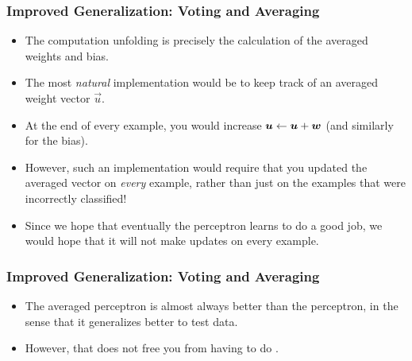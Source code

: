 \documentclass[trans]{beamer}
\begin{document}
\begin{frame}
  \frametitle{Improved Generalization: Voting and Averaging}
\begin{itemize}
\item 
The computation unfolding is
precisely the calculation of the averaged weights and bias.  
\item The most
\emph{natural} implementation would be to keep track of an averaged
weight vector $\vec u$. 
\item At the end of every example, you would
increase $\boldsymbol{u} \leftarrow \boldsymbol{u} + {\boldsymbol{w}}$ (and similarly for the
bias). 
\item However, such an implementation would require that you updated
the averaged vector on \emph{every} example, rather than just on the
examples that were incorrectly classified!  
\item Since we hope that
eventually the perceptron learns to do a good job, we would hope that
it will not make updates on every example.  
\end{itemize}
\end{frame}
\begin{frame}
  \frametitle{Improved Generalization: Voting and Averaging}
\begin{itemize}
\item 
The averaged perceptron is almost always better than the perceptron,
in the sense that it generalizes better to test data. 
\item However, that
does not free you from having to do .  
\end{itemize}
\end{frame}
\end{document}
